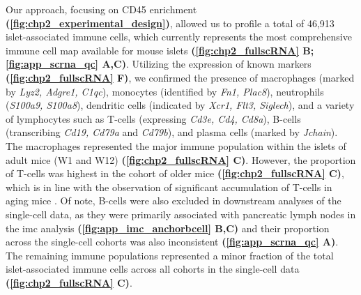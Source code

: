 \par Our approach, focusing on CD45 enrichment \textbf{(\autoref{fig:chp2_experimental_design})}, allowed us to profile a total of 46,913 islet-associated immune cells, which currently represents the most comprehensive immune cell map available for mouse islets \textbf{(\autoref{fig:chp2_fullscRNA} B; \autoref{fig:app_scrna_qc} A,C)}. Utilizing the expression of known markers \textbf{(\autoref{fig:chp2_fullscRNA} F)}, we confirmed the presence of macrophages (marked by \textit{Lyz2, Adgre1, C1qc}), monocytes (identified by \textit{Fn1, Plac8}), neutrophils (\textit{S100a9, S100a8}), dendritic cells (indicated by \textit{Xcr1, Flt3, Siglech}), and a variety of lymphocytes such as T-cells (expressing \textit{Cd3e, Cd4, Cd8a}), B-cells (transcribing \textit{Cd19, Cd79a} and \textit{Cd79b}), and plasma cells (marked by \textit{Jchain}). The macrophages represented the major immune population within the islets of adult mice (W1 and W12) \textbf{(\autoref{fig:chp2_fullscRNA} C)}. However, the proportion of T-cells was highest in the cohort of older mice \textbf{(\autoref{fig:chp2_fullscRNA} C)}, which is in line with the observation of significant accumulation of T-cells in aging mice \textbf{\cite{denroche_t_2021}}. Of note, B-cells were also excluded in downstream analyses of the single-cell data, as they were primarily associated with pancreatic lymph nodes in the \gls{imc} analysis \textbf{(\autoref{fig:app_imc_anchorbcell} B,C)} and their proportion across the single-cell cohorts was also inconsistent \textbf{(\autoref{fig:app_scrna_qc} A)}. The remaining immune populations represented a minor fraction of the total islet-associated immune cells across all cohorts in the single-cell data \textbf{(\autoref{fig:chp2_fullscRNA} C)}.\\%

